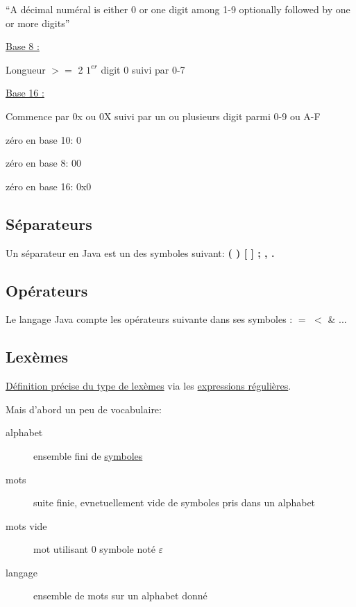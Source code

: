 \documentclass[a4paper,10pt]{report}
\begin{document}
      ``A décimal numéral is either 0 or one digit among 1-9 optionally followed by one or more digits''
      
      
      \underline{Base 8 :}
      
      Longueur $>=$ 2
      \newline $1^{er}$ digit 0 suivi par 0-7
      
      \underline{Base 16 :}
      
      Commence par 0x ou 0X suivi par un ou plusieurs digit parmi 0-9 ou A-F
      
      zéro en base 10: 0
      
      zéro en base 8: 00
      
      zéro en base 16: 0x0
      
      \subsection{Séparateurs}
      
      Un séparateur en Java est un des symboles suivant: \textbf{( ) { } [ ] ; , .}
      
      \subsection{Opérateurs}
      
      Le langage Java compte les opérateurs suivante dans ses symboles : $=$ $<$ \& ...
      
      \subsection{Lexèmes}
      
      \underline{Définition précise du type de lexèmes} via les \underline{expressions régulières}.
      
      
      Mais d'abord un peu de vocabulaire:
      
      \begin{description}
       \item[alphabet] ensemble fini de \underline{symboles}
       \item[mots] suite finie, evnetuellement vide de symboles pris dans un alphabet
       \item[mots vide] mot utilisant 0 symbole noté $\varepsilon$
       \item[langage] ensemble de mots sur un alphabet donné
      \end{description}

      
\end{document}
